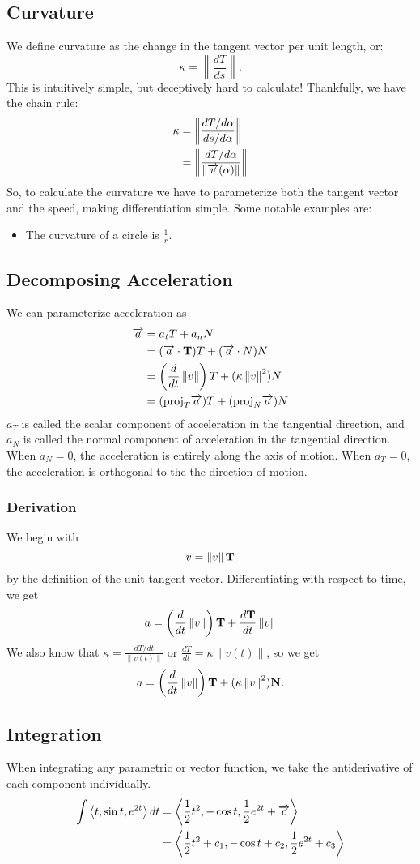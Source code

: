\documentclass[12pt]{article}
\theoremstyle{plain} %
\theoremstyle{definition}
\theoremstyle{definition}
\theoremstyle{definition}
\theoremstyle{remark}
\newcommand{\vecv}{\vv{v}}
\newcommand{\angled}[1]{\left\langle {#1} \right\rangle}
\newcommand*{\vv}[1]{\overrightarrow{\mkern0mu#1}}
\renewcommand{\norm}[1]{\left\lVert#1\right\rVert}
\newcommand{\ddt}{\frac{d}{dt}}
\begin{document}
\subsection{Curvature}
We define curvature as the change in the tangent vector per unit length, or:
\[ \kappa = \norm{\frac{dT}{ds}}. \]
This is intuitively simple, but deceptively hard to calculate! Thankfully, we have the chain rule:
\begin{align*}
    \kappa & = \norm{\frac{dT/d\alpha}{ds/d\alpha}} \\
    & = \norm{\frac{dT/d\alpha}{\norm{\vecv(\alpha)}}}
\end{align*}
So, to calculate the curvature we have to parameterize both the tangent vector and the speed, making differentiation simple. Some notable examples are:
\begin{itemize}
    \item The curvature of a circle is $\frac{1}{r}$.
\end{itemize}
\subsection{Decomposing Acceleration}
We can parameterize acceleration as
\begin{align*}
\vv{a} &= a_tT + a_nN \\
& = (\vv{a} \cdot \vb{T})T + (\vv{a} \cdot N)N \\
& = \left(\ddt \norm{v}\right)T + (\kappa \norm{v}^2)N \\
& = (\text{proj}_T\vv{a})T + (\text{proj}_N\vv{a})N
\end{align*}
$a_T$ is called the scalar component of acceleration in the tangential direction, and $a_N$ is called the normal component of acceleration in the tangential direction. When $a_N=0$, the acceleration is entirely along the axis of motion. When $a_T=0$, the acceleration is orthogonal to the the direction of motion.
\subsubsection{Derivation}
We begin with
\[ v = \norm{v}\vb{T} \] by the definition of the unit tangent vector.
Differentiating with respect to time, we get
\[ a = \left(\ddt \norm{v}\right)\vb{T} + \frac{d \vb{T}}{dt} \norm{v} \]
We also know that $\kappa = \frac{dT/dt}{\norm{v(t)}}$ or $\frac{dT}{dt} = \kappa \norm{v(t)}$, so we get
\[ a = \left(\ddt \norm{v}\right)\vb{T} + (\kappa \norm{v}^2)\vb{N}. \]

\subsection{Integration}
When integrating any parametric or vector function, we take the antiderivative of each component individually.
\begin{align*}
    \int{\angled{t,\sin{t},e^{2t}}dt} &= \angled{\frac{1}{2}t^2,-\cos{t},\frac{1}{2}e^{2t} + \vv{c}} \\
    &= \angled{\frac{1}{2}t^2+c_1,-\cos{t}+c_2,\frac{1}{2}e^{2t}+c_3}
\end{align*}
\end{document}
